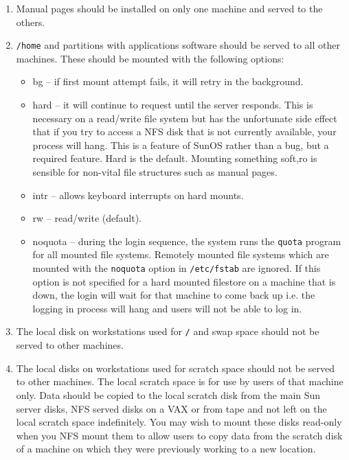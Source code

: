 \begin{enumerate}

\item Manual pages should be installed on only one machine and served to the
others.

\item {\tt /home} and partitions with applications software should be served to
all other machines. These should be mounted with the following options:

\begin{itemize}

\item bg -- if first mount attempt fails, it will retry in the background.

\item hard -- it will continue to request until the server responds.
This is necessary on a read/write file system but has the unfortunate
side effect that if you try to access a NFS disk that is not currently
available, your process will hang. This is a feature of SunOS
rather than a bug, but a required feature. Hard is the default.
Mounting something soft,ro is sensible for non-vital file structures
such as manual pages.

\item intr -- allows keyboard interrupts on hard mounts.

\item rw -- read/write (default).

\item noquota -- during the login sequence, the system runs the {\tt quota}
program for all mounted file systems. Remotely mounted file systems which are
mounted with the {\tt noquota} option in {\tt /etc/fstab} are ignored. If this
option is not specified for a hard mounted filestore on a machine that is
down, the login will wait for that machine to come back up i.e. the logging
in process will hang and users will not be able to log in.

\end{itemize}

\item The local disk on workstations used for {\tt /} and swap space should
not be served to other machines.

\item The local disks on workstations used for scratch space should
not be served to other machines. The local scratch space is for use
by users of that machine only. Data should be copied to the local
scratch disk from the main Sun server disks, NFS served disks on a VAX or
from tape and not left on the local scratch space indefinitely. You may wish to
mount these
disks read-only when you NFS mount them to allow users to copy data from the
scratch disk of a machine on which they were previously working to a new
location.

\end{enumerate}

